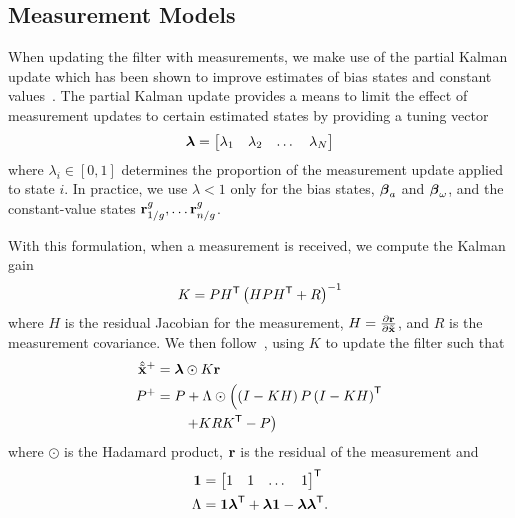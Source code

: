 
\subsection{Measurement Models}
\label{sec:measurement_models}

When
updating the filter with measurements, we make use of the partial Kalman update
which has been shown to improve estimates of bias states and constant values~\cite{brink2017partial}. The partial Kalman update provides a
means to limit the effect of measurement updates to certain estimated
states by providing a tuning vector
\begin{equation}
  \boldsymbol{\mathrm{\lambda}} =
\begin{bmatrix}
  \lambda_1 & \lambda_2 & \dots & \lambda_N
\end{bmatrix}
\end{equation}
where $\lambda_i \in \left[ 0, 1\right]$ determines the proportion of the
measurement update applied to state $i$.
In practice, we use $\lambda < 1$ only for the
bias states, $\boldsymbol{\mathrm{\beta}}_a$ and $\boldsymbol{\mathrm{\beta}}_\omega$, and the
constant-value states $\vect{r}_{1/g}^{g}, \dots \vect{r}_{n/g}^{g}$.

With this formulation,
when a measurement is received, we compute the Kalman gain
\begin{equation}
  K = P H^{\mathsf{T}} \left(H P H^{\mathsf{T}} + R \right)^{-1}
\end{equation}
where $H$ is the residual Jacobian for the measurement,
$H=\frac{\partial \boldsymbol{\mathrm{r}}}{\partial \tilde{\boldsymbol{\mathrm{x}}}}$,
and $R$ is the
measurement covariance. We then follow~\cite{brink2017partial}, using $K$ to update the filter such that
\begin{align}
  \hat{\tilde{\boldsymbol{\mathrm{x}}}}^{+} &= \boldsymbol{\mathrm{\lambda}} \odot K \boldsymbol{\mathrm{r}} \\
  P^{+} &= P + \Lambda \odot \left( \left(I - K H \right) P \left(I - K H
  \right)^{\mathsf{T}} \right. \\
  & \qquad \left. + K R K^{\mathsf{T}} - P \right) \nonumber
\end{align}
where $\odot$ is the Hadamard product, $\boldsymbol{\mathrm{r}}$ is the residual of the
measurement and
\begin{align}
  \boldsymbol{\mathrm{1}} &= \begin{bmatrix} 1 & 1 & \dots & 1 \end{bmatrix}^{\mathsf{T}} \\
  \Lambda &= \boldsymbol{\mathrm{1}} \boldsymbol{\mathrm{\lambda}}^{\mathsf{T}} + \boldsymbol{\mathrm{\lambda}} \boldsymbol{\mathrm{1}} -
  \boldsymbol{\mathrm{\lambda}} \boldsymbol{\mathrm{\lambda}}^{\mathsf{T}}.
\end{align}

